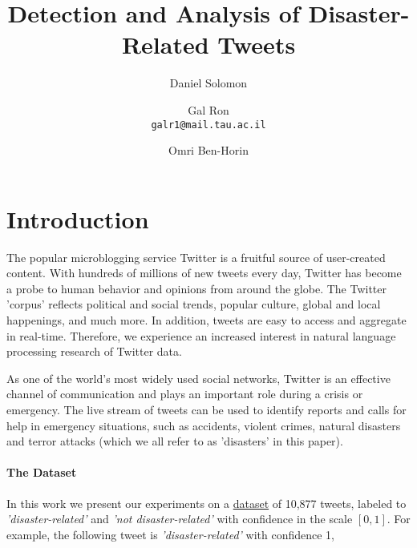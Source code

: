 \documentclass[letterpaper,twocolumn,10pt]{article}
\begin{document}
\date{}

\title{\Large \bf Detection and Analysis of Disaster-Related Tweets}

\author{
{\rm Daniel Solomon}\\
\texttt{}
\and
{\rm Gal Ron}\\
\texttt{galr1@mail.tau.ac.il‬}
\and
{\rm Omri Ben-Horin}\\
\texttt{}
}

\maketitle

\thispagestyle{empty}


\abstract{}

\section{Introduction}
The popular microblogging service Twitter is a fruitful source of user-created content. With hundreds of millions of new tweets every day, Twitter has become a probe to human behavior and opinions from around the globe. The Twitter 'corpus' reflects political and social trends, popular culture, global and local happenings, and much more. In addition, tweets are easy to access and aggregate in real-time. Therefore, we experience an increased interest in natural language processing research of Twitter data.

As one of the world's most widely used social networks, Twitter is an effective channel of communication and plays an important role during a crisis or emergency. The live stream of tweets can be used to identify reports and calls for help in emergency situations, such as accidents, violent crimes, natural disasters and terror attacks (which we all refer to as 'disasters' in this paper).

\paragraph{The Dataset}
In this work we present our experiments on a \href{https://www.crowdflower.com/data-for-everyone/}{dataset} of 10,877 tweets, labeled to \textit{'disaster-related'} and \textit{'not disaster-related'} with confidence in the scale $[0,1]$. For example, the following tweet is \textit{'disaster-related'} with confidence 1,
\end{document}
